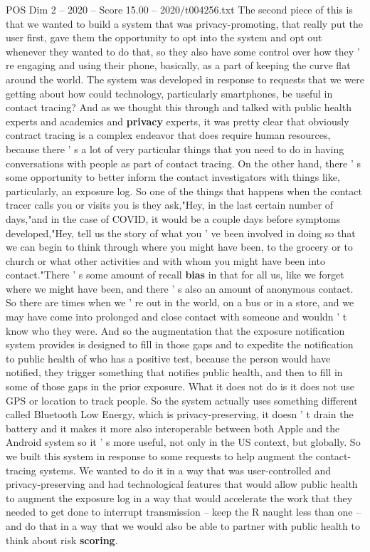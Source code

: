 \begin{textsample}{POS Dim 2 – 2020 – Score 15.00 – 2020/t004256.txt}
The second piece of this is that we wanted to build a system that was privacy-promoting, that really put the user first, gave them the opportunity to opt into the system and opt out whenever they wanted to do that, so they also have some control over how they ' re engaging and using their phone, basically, as a part of keeping the curve flat around the world.
The system was developed in response to requests that we were getting about how could technology, particularly smartphones, be useful in contact tracing?
And as we thought this through and talked with public health experts and academics and \textbf{privacy} experts, it was pretty clear that obviously contract tracing is a complex endeavor that does require human resources, because there ' s a lot of very particular things that you need to do in having conversations with people as part of contact tracing.
On the other hand, there ' s some opportunity to better inform the contact investigators with things like, particularly, an exposure log.
So one of the things that happens when the contact tracer calls you or visits you is they ask,"Hey, in the last certain number of days,"and in the case of COVID, it would be a couple days before symptoms developed,"Hey, tell us the story of what you ' ve been involved in doing so that we can begin to think through where you might have been, to the grocery or to church or what other activities and with whom you might have been into contact."There ' s some amount of recall \textbf{bias} in that for all us, like we forget where we might have been, and there ' s also an amount of anonymous contact.
So there are times when we ' re out in the world, on a bus or in a store, and we may have come into prolonged and close contact with someone and wouldn ' t know who they were.
And so the augmentation that the exposure notification system provides is designed to fill in those gaps and to expedite the notification to public health of who has a positive test, because the person would have notified, they trigger something that notifies public health, and then to fill in some of those gaps in the prior exposure.
What it does not do is it does not use GPS or location to track people.
So the system actually uses something different called Bluetooth Low Energy, which is privacy-preserving, it doesn ' t drain the battery and it makes it more also interoperable between both Apple and the Android system so it ' s more useful, not only in the US context, but globally.
So we built this system in response to some requests to help augment the contact-tracing systems.
We wanted to do it in a way that was user-controlled and privacy-preserving and had technological features that would allow public health to augment the exposure log in a way that would accelerate the work that they needed to get done to interrupt transmission -- keep the R naught less than one -- and do that in a way that we would also be able to partner with public health to think about risk \textbf{scoring}.

\end{textsample}
